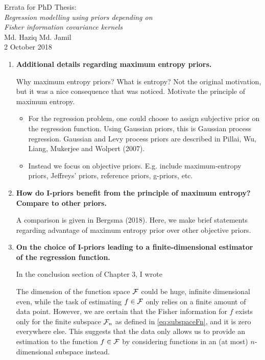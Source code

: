 \documentclass[11pt,showframe]{report}
\begin{document}
\begin{center}
  {\Large Errata for PhD Thesis:} \\[0.5em]
  \textit{\large Regression modelling using priors depending on} \\[-0.2em]
  \textit{\large Fisher information covariance kernels} \\[0.5em]
  {\large Md. Haziq Md. Jamil} \\
  {\large 2 October 2018}
\end{center}

\vspace{2em}

\begin{enumerate}
  \item \textbf{Additional details regarding maximum entropy priors.}
  
  Why maximum entropy priors? What is entropy? Not the original motivation, but it was a nice consequence that was noticed.
  Motivate the principle of maximum entropy.
  
  \begin{itemize}
    \item For the regression problem, one could choose to assign subjective prior on the regression function. Using Gaussian priors, this is Gaussian process regression. Gaussian and Levy process priors are described in Pillai, Wu, Liang, Mukerjee and Wolpert (2007).
    \item Instead we focus on objective priors. E.g. include maximum-entropy priors, Jeffreys' priors, reference priors, g-priors, etc.
  \end{itemize}
  
  \item \textbf{How do I-priors benefit from the principle of maximum entropy? Compare to other priors.}
  
  A comparison is given in Bergsma (2018).
  Here, we make brief statements regarding advantage of maximum entropy prior over other objective priors.
  
  \item \textbf{On the choice of I-priors leading to a finite-dimensional estimator of the regression function.}
  
  In the conclusion section of Chapter 3, I wrote
  
  \begin{displayquote}
The dimension of the function space ${\mathcal F}$ could be huge, infinite dimensional even, while the task of estimating $f\in{\mathcal F}$ only relies on a finite amount of data point.
However, we are certain that the Fisher information for $f$ exists only for the finite subspace ${\mathcal F}_n$ as defined in \cref{eq:subspaceFn}, and it is zero everywhere else.
This suggests that the data only allows us to provide an estimation to the function $f\in{\mathcal F}$ by considering functions in an (at most) $n$-dimensional subspace instead.
\end{displayquote}
  

\end{enumerate}
\end{document}
